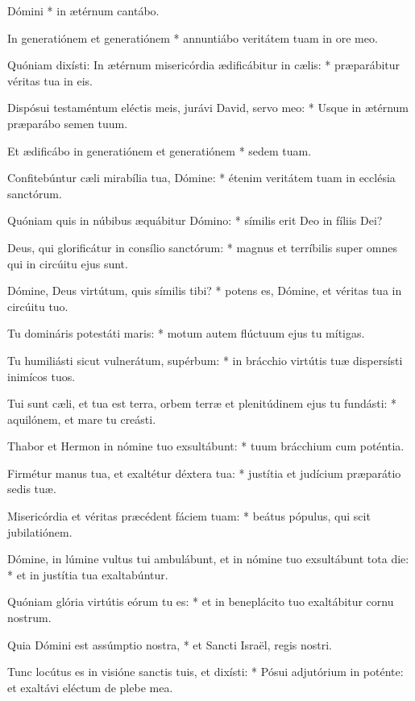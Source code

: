 \begin{psalmus}

     Dómini * in ætérnum cantábo.

    In generatiónem et generatiónem * annuntiábo veritátem tuam in ore meo.

    Quóniam dixísti: In ætérnum misericórdia ædificábitur in cælis: * præparábitur véritas tua in eis.

    Dispósui testaméntum eléctis meis, jurávi David, servo meo: * Usque in ætérnum præparábo semen tuum.

    Et ædificábo in generatiónem et generatiónem * sedem tuam.

    Confitebúntur cæli mirabília tua, Dómine: * étenim veritátem tuam in ecclésia sanctórum.

    Quóniam quis in núbibus æquábitur Dómino: * símilis erit Deo in fíliis Dei?

    Deus, qui glorificátur in consílio sanctórum: * magnus et terríbilis super omnes qui in circúitu ejus sunt.

    Dómine, Deus virtútum, quis símilis tibi? * potens es, Dómine, et véritas tua in circúitu tuo.

    Tu domináris potestáti maris: * motum autem flúctuum ejus tu mítigas.

    Tu humiliásti sicut vulnerátum, supérbum: * in brácchio virtútis tuæ dispersísti inimícos tuos.

    Tui sunt cæli, et tua est terra, orbem terræ et plenitúdinem ejus tu fundásti: * aquilónem, et mare tu creásti.

    Thabor et Hermon in nómine tuo exsultábunt: * tuum brácchium cum poténtia.

    Firmétur manus tua, et exaltétur déxtera tua: * justítia et judícium præparátio sedis tuæ.

    Misericórdia et véritas præcédent fáciem tuam: * beátus pópulus, qui scit jubilatiónem.

    Dómine, in lúmine vultus tui ambulábunt, et in nómine tuo exsultábunt tota die: * et in justítia tua exaltabúntur.

    Quóniam glória virtútis eórum tu es: * et in beneplácito tuo exaltábitur cornu nostrum.

    Quia Dómini est assúmptio nostra, * et Sancti Israël, regis nostri.

    Tunc locútus es in visióne sanctis tuis, et dixísti: * Pósui adjutórium in poténte: et exaltávi eléctum de plebe mea.


\end{psalmus}
